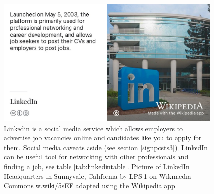 \documentclass[
]{book}
\begin{document}
\begin{figure}

{\centering \includegraphics[width=0.9\linewidth]{images/linkedin} 

}

\caption{\href{https://en.wikipedia.org/wiki/LinkedIn}{Linkedin} is a social media service which allows employers to advertise job vacancies online and candidates like you to apply for them. Social media caveats aside (see section \ref{signposts3}), LinkedIn can be useful tool for networking with other professionals and finding a job, see table \ref{tab:linkedintable}. Picture of LinkedIn Headquarters in Sunnyvale, California by LPS.1 on Wikimedia Commons \href{https://w.wiki/5sEF}{w.wiki/5sEF} adapted using the \href{https://apps.apple.com/us/app/wikipedia/id324715238}{Wikipedia app}}\label{fig:linkedin-fig}
\end{figure}
\end{document}
